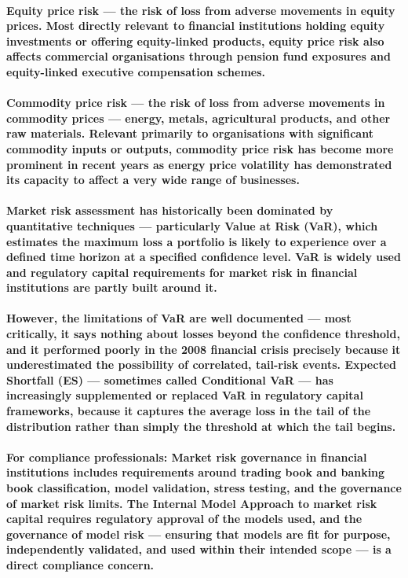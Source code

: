 \paragraph{\textbf{Equity price risk} — the risk of loss from adverse movements in equity prices. Most directly relevant to financial institutions holding equity investments or offering equity-linked products, equity price risk also affects commercial organisations through pension fund exposures and equity-linked executive compensation schemes.}
\paragraph{\textbf{Commodity price risk} — the risk of loss from adverse movements in commodity prices — energy, metals, agricultural products, and other raw materials. Relevant primarily to organisations with significant commodity inputs or outputs, commodity price risk has become more prominent in recent years as energy price volatility has demonstrated its capacity to affect a very wide range of businesses.}
\paragraph{\textbf{Market risk assessment} has historically been dominated by quantitative techniques — particularly \textbf{Value at Risk (VaR)}, which estimates the maximum loss a portfolio is likely to experience over a defined time horizon at a specified confidence level. VaR is widely used and regulatory capital requirements for market risk in financial institutions are partly built around it.}
\paragraph{However, the limitations of VaR are well documented — most critically, it says nothing about losses beyond the confidence threshold, and it performed poorly in the 2008 financial crisis precisely because it underestimated the possibility of correlated, tail-risk events. Expected Shortfall (ES) — sometimes called Conditional VaR — has increasingly supplemented or replaced VaR in regulatory capital frameworks, because it captures the average loss in the tail of the distribution rather than simply the threshold at which the tail begins.}
\paragraph{\textbf{For compliance professionals}: Market risk governance in financial institutions includes requirements around trading book and banking book classification, model validation, stress testing, and the governance of market risk limits. The Internal Model Approach to market risk capital requires regulatory approval of the models used, and the governance of model risk — ensuring that models are fit for purpose, independently validated, and used within their intended scope — is a direct compliance concern.}

